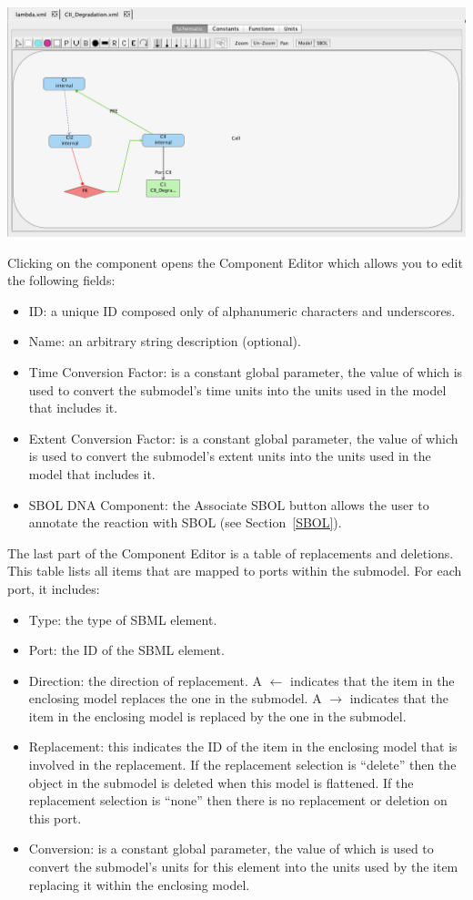 \documentclass[titlepage,11pt]{article}
\begin{document}
\begin{center}
\includegraphics[width=160mm]{screenshots/addPort}
\end{center}

Clicking on the component opens the Component Editor which allows you to edit the following fields:
\begin{itemize}
\item ID: a unique ID composed only of alphanumeric characters and underscores.
\item Name: an arbitrary string description (optional).
\item Time Conversion Factor: is a constant global parameter, the value of which is used to convert the submodel's time units into the units used in the model that includes it.
\item Extent Conversion Factor: is a constant global parameter, the value of which is used to convert the submodel's extent units into the units used in the model that includes it.
\item SBOL DNA Component: the Associate SBOL button allows the user to annotate the reaction with SBOL (see Section~\ref{SBOL}).
\end{itemize}
The last part of the Component Editor is a table of replacements and deletions.  This table lists all items that are mapped to ports within the submodel.  For each port, it includes:
\begin{itemize}
\item Type: the type of SBML element.
\item Port: the ID of the SBML element.
\item Direction: the direction of replacement.  A $\leftarrow$ indicates that the item in the enclosing model replaces the one in the submodel.  A $\rightarrow$ indicates that the item in the enclosing model is replaced by the one in the submodel.
\item Replacement: this indicates the ID of the item in the enclosing model that is involved in the replacement.  If the replacement selection is ``delete'' then the object in the submodel is deleted when this model is flattened.  If the replacement selection is ``none'' then there is no replacement or deletion on this port.
\item Conversion: is a constant global parameter, the value of which is used to convert the submodel's units for this element into the units used by the item replacing it within the enclosing model.
\end{itemize}
\end{document}
